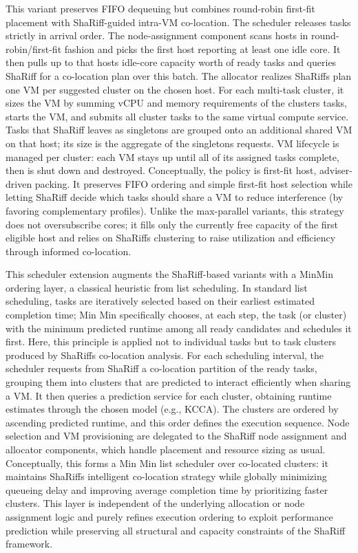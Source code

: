 This variant preserves FIFO dequeuing but combines round-robin first-fit placement with ShaRiff-guided intra-VM co-location. The scheduler releases tasks strictly in arrival order. The node-assignment component scans hosts in round-robin/first-fit fashion and picks the first host reporting at least one idle core. It then pulls up to that hosts idle-core capacity worth of ready tasks and queries ShaRiff for a co-location plan over this batch.
The allocator realizes ShaRiffs plan one VM per suggested cluster on the chosen host. For each multi-task cluster, it sizes the VM by summing vCPU and memory requirements of the clusters tasks, starts the VM, and submits all cluster tasks to the same virtual compute service. Tasks that ShaRiff leaves as singletons are grouped onto an additional shared VM on that host; its size is the aggregate of the singletons requests. VM lifecycle is managed per cluster: each VM stays up until all of its assigned tasks complete, then is shut down and destroyed.
Conceptually, the policy is first-fit host, adviser-driven packing. It preserves FIFO ordering and simple first-fit host selection while letting ShaRiff decide which tasks should share a VM to reduce interference (by favoring complementary profiles). Unlike the max-parallel variants, this strategy does not oversubscribe cores; it fills only the currently free capacity of the first eligible host and relies on ShaRiffs clustering to raise utilization and efficiency through informed co-location.

This scheduler extension augments the ShaRiff-based variants with a MinMin ordering layer, a classical heuristic from list scheduling. In standard list scheduling, tasks are iteratively selected based on their earliest estimated completion time; Min Min specifically chooses, at each step, the task (or cluster) with the minimum predicted runtime among all ready candidates and schedules it first. Here, this principle is applied not to individual tasks but to task clusters produced by ShaRiffs co-location analysis.
For each scheduling interval, the scheduler requests from ShaRiff a co-location partition of the ready tasks, grouping them into clusters that are predicted to interact efficiently when sharing a VM. It then queries a prediction service for each cluster, obtaining runtime estimates through the chosen model (e.g., KCCA). The clusters are ordered by ascending predicted runtime, and this order defines the execution sequence. Node selection and VM provisioning are delegated to the ShaRiff node assignment and allocator components, which handle placement and resource sizing as usual.
Conceptually, this forms a Min Min list scheduler over co-located clusters: it maintains ShaRiffs intelligent co-location strategy while globally minimizing queueing delay and improving average completion time by prioritizing faster clusters. This layer is independent of the underlying allocation or node assignment logic and purely refines execution ordering to exploit performance prediction while preserving all structural and capacity constraints of the ShaRiff framework.